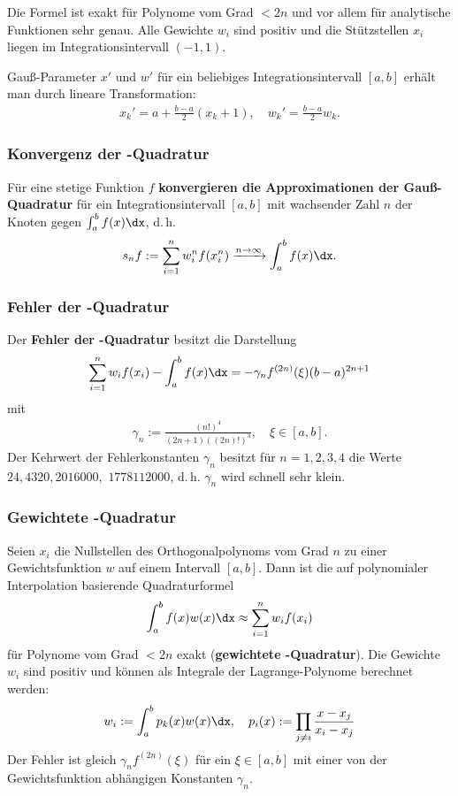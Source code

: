 Die Formel ist exakt für Polynome vom Grad $< 2n$ und vor allem für analytische
Funktionen sehr genau.
Alle Gewichte $w_i$ sind positiv und
die Stützstellen $x_i$ liegen im Integrationsintervall $(-1, 1)$.

Gauß-Parameter $x'$ und $w'$ für ein beliebiges Integrationsintervall $[a, b]$
erhält man durch lineare Transformation:
\begin{align*}
    x_k' = a + \frac{b - a}{2} (x_k + 1), \quad
    w_k' = \frac{b - a}{2} w_k.
\end{align*}

\subsubsection{%
    Konvergenz der -Quadratur%
}

Für eine stetige Funktion $f$
\textbf{konvergieren die Approximationen der Gauß-Quadratur}
für ein Integrationsintervall $[a, b]$ mit wachsender Zahl $n$
der Knoten gegen $\int_a^b f(x)\dx$, d.\,h.
\begin{align*}
    s_n f := \sum_{i=1}^n w_i^n f(x_i^n) \xrightarrow{n \to \infty}
    \int_a^b f(x)\dx.
\end{align*}

\subsubsection{%
    Fehler der -Quadratur%
}

Der \textbf{Fehler der -Quadratur} besitzt die Darstellung
\begin{align*}
    \sum_{i=1}^n w_i f(x_i) - \int_a^b f(x)\dx =
    -\gamma_n f^{(2n)}(\xi)(b - a)^{2n + 1}
\end{align*}
mit
\begin{align*}
    \gamma_n := \frac{(n!)^4}{(2n + 1)((2n)!)^3},\quad \xi \in [a, b].
\end{align*}
Der Kehrwert der Fehlerkonstanten $\gamma_n$ besitzt für $n = 1, 2, 3, 4$
die Werte $24, 4320, 2016000,$
$1778112000$, d.\,h. $\gamma_n$ wird schnell sehr klein.

\subsubsection{%
    Gewichtete -Quadratur%
}

Seien $x_i$ die Nullstellen des Orthogonalpolynoms vom Grad $n$ zu einer
Gewichtsfunktion $w$ auf einem Intervall $[a, b]$.
Dann ist die auf polynomialer Interpolation basierende Quadraturformel
\begin{align*}
    \int_a^b f(x)w(x)\dx \approx \sum_{i=1}^n w_i f(x_i)
\end{align*}
für Polynome vom Grad $< 2n$ exakt
(\textbf{gewichtete -Quadratur}).
Die Gewichte $w_i$ sind positiv und können als Integrale der Lagrange-Polynome
berechnet werden:
\begin{align*}
    w_i := \int_a^b p_k(x)w(x)\dx, \quad
    p_i(x) := \prod_{j \not= i} \frac{x - x_j}{x_i - x_j}
\end{align*}
Der Fehler ist gleich $\gamma_n f^{(2n)}(\xi)$ für ein $\xi \in [a, b]$
mit einer von der Gewichtsfunktion abhängigen Konstanten $\gamma_n$.

